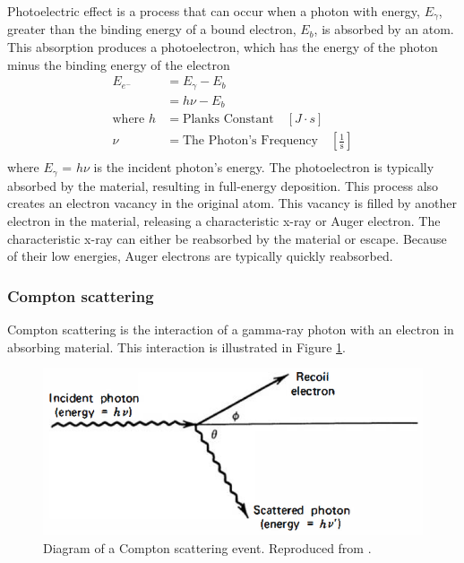 Photoelectric effect is a process that can occur when a photon with energy, $E_{\gamma}$, greater than the binding energy of a bound electron, $E_{b}$, is absorbed by an atom. This absorption produces a photoelectron, which has the energy of the photon minus the binding energy of the electron
%
\begin{align} \label{eq:photoelectric_effect}
E_{e^{-}} &= E_{\gamma} - E_{b} \\
&= h\nu - E_{b} \\
\text{where } h &= \text{Planks Constant} \quad [J \cdot s] \nonumber \\
\nu &= \text{The Photon's Frequency} \quad \left[\frac{1}{\text{s}}\right] \nonumber \\
\end{align}
%
where $E_{\gamma}$ = $h\nu$ is the incident photon's energy. The photoelectron is typically absorbed by the material, resulting in full-energy deposition. This process also creates an electron vacancy in the original atom. This vacancy is filled by another electron in the material, releasing a characteristic x-ray or Auger electron. The characteristic x-ray can either be reabsorbed by the material or escape. Because of their low energies, Auger electrons are typically quickly reabsorbed.

\subsubsection{Compton scattering}

Compton scattering is the interaction of a gamma-ray photon with an electron in absorbing material. This interaction is illustrated in Figure \ref{fig:compton_scatter}.



\begin{figure}[H]
\centering
\includegraphics[width=0.7\linewidth]{images/compton_scatter}
\caption{Diagram of a Compton scattering event. Reproduced from \cite{knoll}.}
\label{fig:compton_scatter}
\end{figure}


